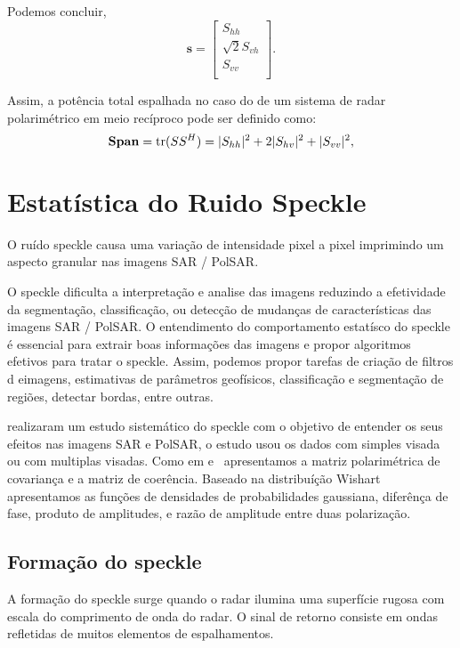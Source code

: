 Podemos concluir,
\begin{equation}\label{vetor_3d} 
\mathbf{s} = \left[
\begin{array}{c}
	S_{hh}      \\
        \sqrt{2}S_{vh}     \\
	S_{vv}      \\
\end{array}
\right].
\end{equation}

Assim, a potência total espalhada no caso do de um sistema de radar polarimétrico em meio recíproco pode ser definido como:
\begin{equation}\label{span_geral}
\mathbf{Span} = \operatorname{tr}(SS^H)=|S_{hh}|^2+2|S_{hv}|^2+|S_{vv}|^2,
\end{equation}


\section{Estatística do Ruido Speckle}
O ruído speckle causa uma variação de intensidade pixel a pixel imprimindo um aspecto granular nas imagens SAR / PolSAR.  

O speckle dificulta a interpretação e analise das imagens reduzindo a efetividade da segmentação, classificação, ou detecção de mudanças de características  das imagens SAR / PolSAR. O entendimento do comportamento estatísco do speckle é essencial para extrair boas informações das imagens e propor algoritmos efetivos para tratar o speckle. Assim, podemos propor tarefas de criação de filtros d eimagens, estimativas de parâmetros geofísicos, classificação e segmentação de regiões, detectar bordas, entre outras.

\cite{lp} realizaram um estudo sistemático do speckle com o objetivo de entender os seus efeitos nas imagens SAR e PolSAR, o estudo usou os dados com simples visada ou com multiplas visadas. Como em  \cite{lp} e~\cite{dmch} apresentamos a matriz polarimétrica de covariança e a matriz de coerência. Baseado na distribuíção Wishart apresentamos as funções de densidades de probabilidades gaussiana, diferênça de fase, produto de amplitudes, e razão de amplitude entre duas polarização.

\subsection{Formação do speckle}   
 A formação do speckle surge quando o radar ilumina uma superfície rugosa com escala do comprimento de onda do radar. O sinal de retorno consiste em ondas refletidas de muitos elementos de espalhamentos. 
 
